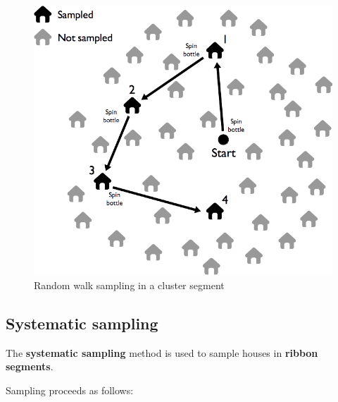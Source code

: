 \documentclass[12pt,a4paper]{book}
\theoremstyle{definition}
\theoremstyle{definition}
\theoremstyle{definition}
\theoremstyle{remark}
\begin{document}
\begin{figure}[H]

{\centering \includegraphics[width=800pt]{figures/stage2sample8} 

}

\caption{Random walk sampling in a cluster segment}\label{fig:sample22}
\end{figure}

\hypertarget{systematic-sampling}{%
\subsection{Systematic sampling}\label{systematic-sampling}}

The \textbf{systematic sampling} method is used to sample houses in
\textbf{ribbon segments}.

Sampling proceeds as follows:
\end{document}

